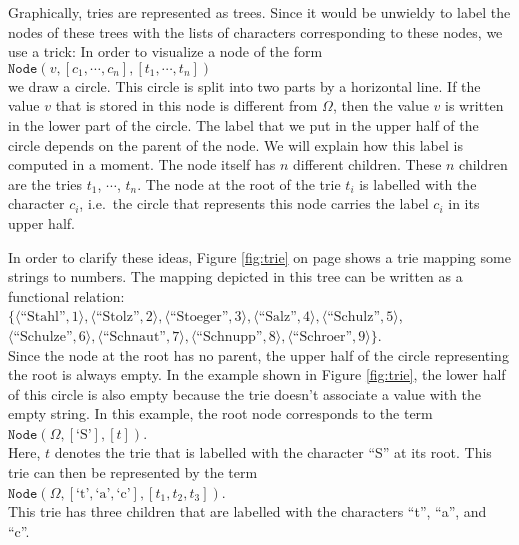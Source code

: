 Graphically, tries are represented as trees.  Since it would be unwieldy to label the nodes of these
trees with the lists of characters corresponding to these nodes, we use a trick:  In order to
visualize a node of the form \\[0.2cm]
\hspace*{1.3cm} 
$\mathtt{Node}(v, [c_1, \cdots, c_n], [t_1, \cdots, t_n])$ \\[0.2cm]
we draw a circle.  This circle is split into two parts by a horizontal line.
If the value  $v$ that is stored in this node is different from $\Omega$, then the value $v$ is
written in the lower part of the circle.  The label that we put in the upper half of the circle
depends on the parent of the node.  We will explain how this label is computed in a moment.
The node itself has $n$ different children.  These $n$ children are the tries
$t_1$, $\cdots$, $t_n$.  The node at the root of the trie $t_i$ is labelled with the character $c_i$,
i.e.~the circle that represents this node carries the label $c_i$ in its upper half.
\pagebreak

In order to clarify these ideas, Figure  \ref{fig:trie} on page \pageref{fig:trie} shows a trie
mapping some strings to numbers.  The mapping depicted in this tree can be written as a functional
relation: 
\\[0.2cm]
\hspace*{1.3cm} $ \bigl\{ \langle \textrm{``Stahl''},   1  \rangle, \langle \textrm{``Stolz''},     2  \rangle, \langle \textrm{``Stoeger''},   3  \rangle, 
             \langle \textrm{``Salz''},      4  \rangle, \langle \textrm{``Schulz''},    5  \rangle$, \\[0.2cm]
\hspace*{1.5cm} $\langle \textrm{``Schulze''},   6  \rangle, \langle \textrm{``Schnaut''},   7  \rangle, 
  \langle \textrm{``Schnupp''},   8  \rangle, 
  \langle \textrm{``Schroer''},   9  \rangle\}$. \\[0.2cm]
Since the node at the root has no parent, the upper half of  the circle representing the root is
always empty.  In the example shown in Figure \ref{fig:trie}, the lower half of this circle is also empty
because the trie doesn't associate a value with the empty string.  In this example, the root node corresponds
to the term  
\\[0.2cm]
\hspace*{1.3cm}
 $\mathtt{Node}(\Omega,[\textrm{`S'}], [t])$. 
\\[0.2cm]
Here,  $t$ denotes the trie that is labelled with the character  ``S'' at its root.
This trie can then be represented by the term  \\[0.2cm]
\hspace*{1.3cm} 
$\mathtt{Node}(\Omega,[\textrm{`t'},\textrm{`a'},\textrm{`c'}], [t_1, t_2, t_3])$. \\[0.2cm]
This trie has three children that are labelled with the characters  ``t'', ``a'', and ``c''.

